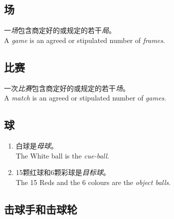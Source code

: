\subsection{场}

\noindent 一\emph{场}包含商定好的或规定的若干\emph{局}。\\
A \emph{game} is an agreed or stipulated number of \emph{frames}.

\subsection{比赛}

\noindent 一次\emph{比赛}包含商定好的或规定的若干\emph{场}。\\
A \emph{match} is an agreed or stipulated number of \emph{games}.

\subsection{球}

\begin{enumerate}[label=(\alph*)]
    \item 白球是\emph{母球}。\\
    The White ball is the \emph{cue-ball}.
    \item 15颗红球和6颗彩球是\emph{目标球}。\\
    The 15 Reds and the 6 colours are the \emph{object balls}.
\end{enumerate}

\subsection{击球手和击球轮}

